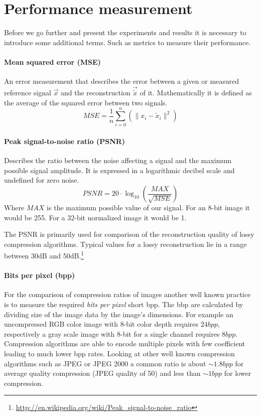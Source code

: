 \section{Performance measurement}
Before we go further and present the experiments and results it is necessary to
introduce some additional terms. Such as metrics to measure their performance.

\paragraph{Mean squared error (MSE)}  An error measurement that
describes the error between a given or measured reference signal $\vec{x}$
and the reconstruction $\vec{\tilde{x}}$ of it. Mathematically it is defined as
the average of the squared error between two signals.
\begin{equation*}
 MSE = \frac{1}{n} \sum_{i=0}^{n} \left( {\lVert x_i -
\tilde{x}_i\rVert^{2}}\right)
\end{equation*}

\paragraph{Peak signal-to-noise ratio (PSNR)} Describes the ratio between the
noise affecting a signal and the maximum possible signal amplitude. It is
expressed in a logarithmic decibel scale and undefined for zero
noise.
\begin{equation*}
 PSNR = 20 \cdot \log_{10} \left(\frac{MAX}{\sqrt{MSE}}\right)
\end{equation*}
Where $MAX$ is the maximum possible value of our signal. For an 8-bit
image it would be 255. For a 32-bit normalized image it would be 1.

The PSNR is primarily used for comparison of the reconstruction quality of
lossy compression algorithms. Typical values for a lossy reconstruction lie in
a range between 30dB and 
50dB.\footnote{\url{http://en.wikipedia.org/wiki/Peak_signal-to-noise_ratio}}

\paragraph{Bits per pixel (bpp)} 
For the comparison of compression ratios of images another well known practice
is to measure the required \emph{bits per pixel} short bpp. The bbp are
calculated by dividing size of the image data by the image's dimensions. For
example an uncompressed RGB color image with 8-bit color depth requires
$24bpp$, respectively a gray scale image with 8-bit for a single
channel requires $8bpp$. Compression algorithms are able to encode
multiple pixels with few coefficient leading to much lower bpp rates.
Looking at other well known compression algorithms such as JPEG or
JPEG 2000 a common ratio is about $\sim1.8bpp$ for average
quality compression (JPEG quality of 50) and less than $\sim1bpp$ for
lower compression.

